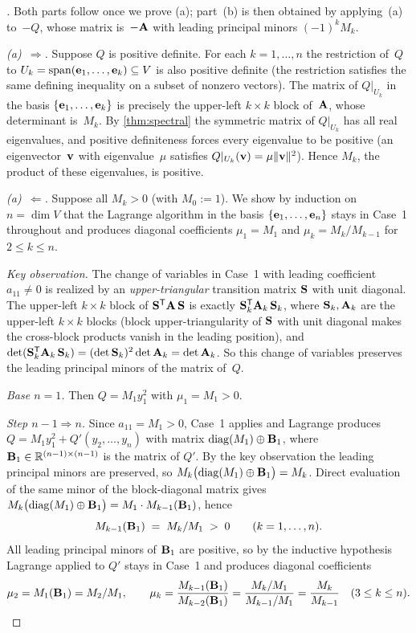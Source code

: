 \begin{proof}[]
Both parts follow once we prove (a); part~(b) is then obtained by
applying~(a) to~$-Q$, whose matrix is~$-\mathbf{A}$ with leading
principal minors $(-1)^k M_k$.

\emph{(a)~$\Rightarrow$.} Suppose $Q$ is positive definite. For each
$k = 1, \dots, n$ the restriction of~$Q$ to
$U_k = \operatorname{span}(\mathbf{e}_1, \dots, \mathbf{e}_k) \subseteq V$ is also
positive definite (the restriction satisfies the same defining
inequality on a subset of nonzero vectors). The matrix of $Q|_{U_k}$
in the basis $\{\mathbf{e}_1, \dots, \mathbf{e}_k\}$ is precisely the
upper-left $k \times k$ block of~$\mathbf{A}$, whose determinant is~$M_k$.
By \cref{thm:spectral} the symmetric matrix of $Q|_{U_k}$ has all
real eigenvalues, and positive definiteness forces every eigenvalue to
be positive (an eigenvector~$\mathbf{v}$ with eigenvalue~$\mu$ satisfies
$Q|_{U_k}(\mathbf{v}) = \mu \|\mathbf{v}\|^2$). Hence $M_k$, the product of
these eigenvalues, is positive.

\emph{(a)~$\Leftarrow$.} Suppose all $M_k > 0$ (with $M_0 := 1$). We
show by induction on $n = \dim V$ that the Lagrange algorithm in the
basis $\{\mathbf{e}_1, \dots, \mathbf{e}_n\}$ stays in Case~1 throughout
and produces diagonal coefficients $\mu_1 = M_1$ and
$\mu_k = M_k / M_{k-1}$ for $2 \le k \le n$.

\emph{Key observation.} The change of variables in Case~1 with leading
coefficient $a_{11} \neq 0$ is realized by an \emph{upper-triangular}
transition matrix $\mathbf{S}$ with unit diagonal. The upper-left
$k \times k$ block of $\mathbf{S}^{\mathsf{T}} \mathbf{A}\, \mathbf{S}$ is exactly
$\mathbf{S}_k^{\mathsf{T}} \mathbf{A}_k\, \mathbf{S}_k$, where $\mathbf{S}_k, \mathbf{A}_k$ are
the upper-left $k \times k$ blocks (block upper-triangularity of
$\mathbf{S}$ with unit diagonal makes the cross-block products vanish in
the leading position), and
$\det(\mathbf{S}_k^{\mathsf{T}} \mathbf{A}_k\, \mathbf{S}_k) = (\det \mathbf{S}_k)^2 \det \mathbf{A}_k = \det \mathbf{A}_k$.
So this change of variables preserves the leading principal minors of
the matrix of~$Q$.

\emph{Base $n = 1$.} Then $Q = M_1 y_1^2$ with $\mu_1 = M_1 > 0$.

\emph{Step $n - 1 \Rightarrow n$.} Since $a_{11} = M_1 > 0$, Case~1
applies and Lagrange produces $Q = M_1 y_1^2 + Q'(y_2, \dots, y_n)$
with matrix $\operatorname{diag}(M_1) \oplus \mathbf{B}_1$, where
$\mathbf{B}_1 \in \mathbb{R}^{(n-1) \times (n-1)}$ is the matrix of $Q'$. By the
key observation the leading principal minors are preserved, so
$M_k\bigl(\operatorname{diag}(M_1) \oplus \mathbf{B}_1\bigr) = M_k$. Direct evaluation
of the same minor of the block-diagonal matrix gives
$M_k\bigl(\operatorname{diag}(M_1) \oplus \mathbf{B}_1\bigr) = M_1 \cdot M_{k-1}(\mathbf{B}_1)$,
hence
\[
  M_{k-1}(\mathbf{B}_1) \;=\; M_k / M_1 \;>\; 0
  \qquad (k = 1, \dots, n).
\]
All leading principal minors of $\mathbf{B}_1$ are positive, so by the
inductive hypothesis Lagrange applied to $Q'$ stays in Case~1 and
produces diagonal coefficients
\[
  \mu_2 = M_1(\mathbf{B}_1) = M_2 / M_1,
  \qquad
  \mu_k = \frac{M_{k-1}(\mathbf{B}_1)}{M_{k-2}(\mathbf{B}_1)} = \frac{M_k/M_1}{M_{k-1}/M_1} = \frac{M_k}{M_{k-1}}
  \quad (3 \le k \le n).
\]


\end{proof}
